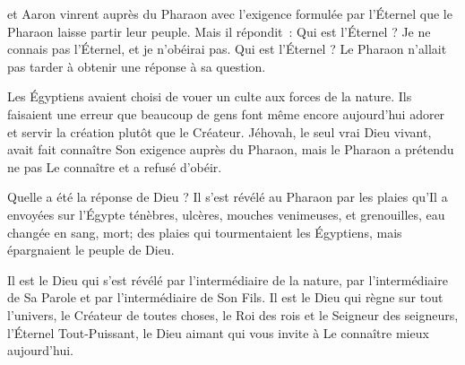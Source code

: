 \dvrule






 et Aaron vinrent auprès du Pharaon
 avec l'exigence formulée par l'Éternel que le Pharaon
 laisse partir leur peuple.
 Mais il répondit~: \og Qui est l'Éternel ? Je ne connais pas l'Éternel,
 et je n'obéirai pas. \fg{}
 Qui est l'Éternel ? Le Pharaon n'allait pas tarder
 à obtenir une réponse à sa question.

Les Égyptiens avaient choisi de vouer un culte aux forces de la nature.
 Ils faisaient une erreur que beaucoup de gens font même encore aujourd'hui
 \ocadr{}adorer et servir la création plutôt que le Créateur.
 Jéhovah, le seul vrai Dieu vivant, avait fait connaître Son exigence
 auprès du Pharaon, mais le Pharaon a prétendu
 ne pas Le connaître et a refusé d'obéir.

Quelle a été la réponse de Dieu ? Il s'est révélé au Pharaon
 par les plaies qu'Il a envoyées sur l'Égypte
 \ocadr{}ténèbres, ulcères, mouches venimeuses, et grenouilles,
 eau changée en sang, mort; des plaies qui tourmentaient les Égyptiens,
 mais épargnaient le peuple de Dieu.


Il est le Dieu qui s'est révélé par l'intermédiaire de la nature,
 par l'intermédiaire de Sa Parole et par l'intermédiaire de Son Fils.
 Il est le Dieu qui règne sur tout l'univers, le Créateur de toutes choses,
 le Roi des rois et le Seigneur des seigneurs,
 l'Éternel Tout-Puissant, le Dieu aimant
 qui vous invite à Le connaître mieux aujourd'hui. 

\dvrule

